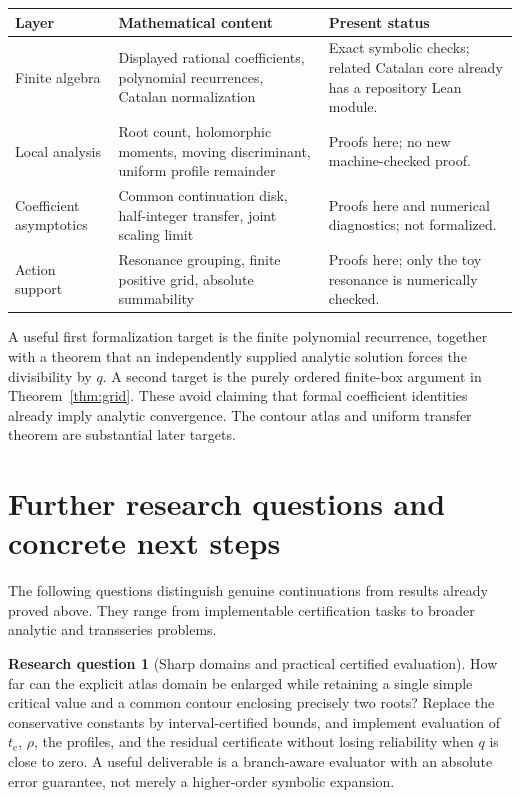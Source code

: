 \documentclass[11pt,a4paper]{article}
\theoremstyle{definition}
\newtheorem{question}{Research question}[section]
\theoremstyle{remark}
\newcommand{\tc}{t_{\mathrm c}}
\begin{document}
\begin{center}
\small
\begin{tabular}{@{}>{\raggedright\arraybackslash}p{}>{\raggedright\arraybackslash}p{}>{\raggedright\arraybackslash}p{}@{}}
\toprule
Layer & Mathematical content & Present status\\
\midrule
Finite algebra & Displayed rational coefficients, polynomial recurrences,
Catalan normalization & Exact symbolic checks; related Catalan core
already has a repository Lean module.\\[4pt]
Local analysis & Root count, holomorphic moments, moving discriminant,
uniform profile remainder & Proofs here; no new machine-checked proof.\\[4pt]
Coefficient asymptotics & Common continuation disk, half-integer transfer,
joint scaling limit & Proofs here and numerical diagnostics; not formalized.\\[4pt]
Action support & Resonance grouping, finite positive grid, absolute
summability & Proofs here; only the toy resonance is numerically checked.\\
\bottomrule
\end{tabular}
\end{center}

A useful first formalization target is the finite polynomial recurrence,
together with a theorem that an independently supplied analytic solution
forces the divisibility by $q$. A second target is the purely ordered
finite-box argument in Theorem~\ref{thm:grid}. These avoid claiming that
formal coefficient identities already imply analytic convergence. The
contour atlas and uniform transfer theorem are substantial later targets.

\section{Further research questions and concrete next steps}
\label{sec:questions}

The following questions distinguish genuine continuations from results
already proved above. They range from implementable certification tasks
to broader analytic and transseries problems.

\begin{question}[Sharp domains and practical certified evaluation]
How far can the explicit atlas domain be enlarged while retaining a
single simple critical value and a common contour enclosing precisely two
roots? Replace the conservative constants by interval-certified bounds,
and implement evaluation of $\tc$, $\rho$, the profiles, and the residual
certificate without losing reliability when $q$ is close to zero.
A useful deliverable is a branch-aware evaluator with an absolute error
guarantee, not merely a higher-order symbolic expansion.
\end{question}
\end{document}
